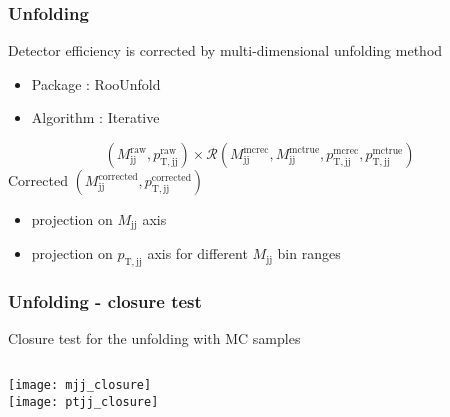 \begin{frame}

\frametitle{Unfolding}
Detector efficiency is corrected by multi-dimensional unfolding method
\begin{itemize}
\item{Package : RooUnfold}
\item{Algorithm : Iterative}
\end{itemize}

	\begin{equation}
	(M_\mathrm{jj}^\mathrm{raw},p_\mathrm{T,jj}^\mathrm{raw}) \times \mathcal{R} (M_\mathrm{jj}^\mathrm{mcrec},M_\mathrm{jj}^\mathrm{mctrue},p_\mathrm{T,jj}^\mathrm{mcrec},p_\mathrm{T,jj}^\mathrm{mctrue})
	\end{equation}
Corrected $(M_\mathrm{jj}^\mathrm{corrected},p_\mathrm{T,jj}^\mathrm{corrected})$ 
\begin{itemize}
\item{projection on $M_\mathrm{jj}$ axis}
\item{projection on $p_\mathrm{T,jj}$ axis for different $M_\mathrm{jj}$ bin ranges}
\end{itemize}	

\end{frame}

\begin{frame}
\frametitle{Unfolding - closure test}
Closure test for the unfolding with MC samples
\begin{columns}[t]
\centering
\texttt{[image: mjj\_closure]}\\
\texttt{[image: ptjj\_closure]}\\
\end{columns}
\end{frame}


